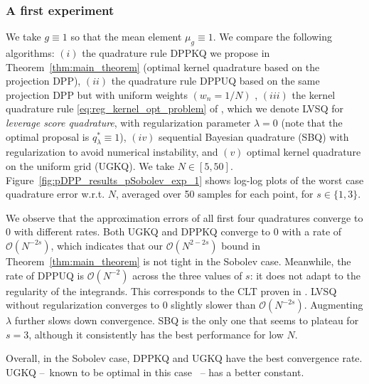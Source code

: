 \documentclass[twoside,11pt]{book}
\numberwithin{theorem}{chapter}
\numberwithin{definition}{chapter}
\numberwithin{proposition}{chapter}
\numberwithin{corollary}{chapter}
\numberwithin{example}{chapter}
\numberwithin{lemma}{chapter}
\numberwithin{assumption}{chapter}
\begin{document}
\subsubsection{A first experiment}
 We take $g\equiv 1$ so that the mean element $\mu_{g} \equiv 1$. We compare the following algorithms: $(i)$ the quadrature rule DPPKQ we propose in Theorem~\ref{thm:main_theorem} (optimal kernel quadrature based on the projection DPP), $(ii)$ the quadrature rule DPPUQ based on the same projection DPP but with uniform weights $(w_{n} = 1/N)$ \cite{Joh97}, $(iii)$ the kernel quadrature rule \eqref{eq:reg_kernel_opt_problem} of \cite{Bac17}, which we denote LVSQ for \emph{leverage score quadrature}, with regularization parameter $\lambda =0$ (note that the optimal proposal is $q_{\lambda}^* \equiv 1$), $(iv)$ sequential Bayesian quadrature (SBQ) \citep{HuDu12} with regularization to avoid numerical instability, and $(v)$ optimal kernel quadrature on the uniform grid (UGKQ). We take $N \in [5,50]$. Figure~\ref{fig:pDPP_results_pSobolev_exp_1} shows log-log plots of the worst case quadrature error w.r.t. $N$, averaged over 50 samples for each point, for $s \in \{1,3\}$.


 We observe that the approximation errors of all first four quadratures converge to $0$ with different rates. Both UGKQ and DPPKQ converge to $0$ with a rate of $\mathcal{O}(N^{-2s})$, which indicates that our $\mathcal{O}(N^{2-2s})$ bound in Theorem~\ref{thm:main_theorem} is not tight in the Sobolev case. Meanwhile, the rate of DPPUQ is $\mathcal{O}(N^{-2})$ across the three values of $s$: it does not adapt to the regularity of the integrands. This corresponds to the CLT proven in \cite{Joh97}.
  LVSQ without regularization converges to $0$ slightly slower than $\mathcal{O}(N^{-2s})$. Augmenting $\lambda$ further slows down convergence. SBQ is the only one that seems to plateau for $s = 3$, although it consistently has the best performance for low $N$.


Overall, in the Sobolev case, DPPKQ and UGKQ have the best convergence rate. UGKQ --~known to be optimal in this case \cite{Boj81}~-- has a better constant.
\end{document}
